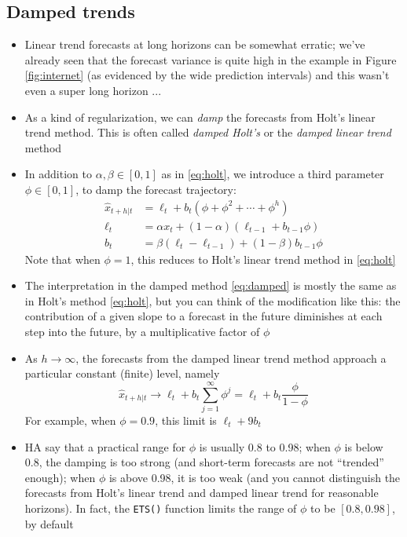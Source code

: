 \documentclass{article}
\begin{document}
\subsection{Damped trends}

\begin{itemize}
\item Linear trend forecasts at long horizons can be somewhat erratic; we've 
  already seen that the forecast variance is quite high in the example in Figure
  \ref{fig:internet} (as evidenced by the wide prediction intervals) and this
  wasn't even a super long horizon ...

\item As a kind of regularization, we can \emph{damp} the forecasts from
  Holt's linear trend method. This is often called \emph{damped Holt's} or the
  \emph{damped linear trend} method 

\item In addition to $\alpha,\beta \in [0,1]$ as in \eqref{eq:holt}, we
  introduce a third parameter $\phi \in [0,1]$, to damp the forecast
  trajectory: 
  \begin{equation}
  \label{eq:damped}
  \begin{aligned}
  \hat{x}_{t+h | t} &= \ell_t + b_t (\phi + \phi^2 + \cdots + \phi^h) \\ 
  \ell_t &= \alpha x_t + (1-\alpha) (\ell_{t-1} + b_{t-1} \phi) \\
  b_t &= \beta (\ell_t - \ell_{t-1}) + (1-\beta) b_{t-1} \phi
  \end{aligned}
  \end{equation}
  Note that when $\phi = 1$, this reduces to Holt's linear trend method in
  \eqref{eq:holt} 

\item The interpretation in the damped method \eqref{eq:damped} is mostly the
  same as in Holt's method \eqref{eq:holt}, but you can think of the
  modification like this: the contribution of a given slope to a forecast in the
  future diminishes at each step into the future, by a multiplicative factor of
  $\phi$   

\item As $h \to \infty$, the forecasts from the damped linear trend method
  approach a particular constant (finite) level, namely
  \[
  \hat{x}_{t+h | t} \to \ell_t + b_t \sum_{j=1}^\infty \phi^j = \ell_t + b_t
  \frac{\phi}{1-\phi} 
  \]
  For example, when $\phi = 0.9$, this limit is $\ell_t + 9 b_t$

\item HA say that a practical range for $\phi$ is usually 0.8 to 0.98; when
  $\phi$ is below 0.8, the damping is too strong (and short-term forecasts are
  not ``trended'' enough); when $\phi$ is above 0.98, it is too weak (and you
  cannot distinguish the forecasts from Holt's linear trend and damped linear
  trend for reasonable horizons). In fact, the \verb|ETS()| function limits the
  range of $\phi$ to be $[0.8, 0.98]$, by default 


\end{itemize}
\end{document}
